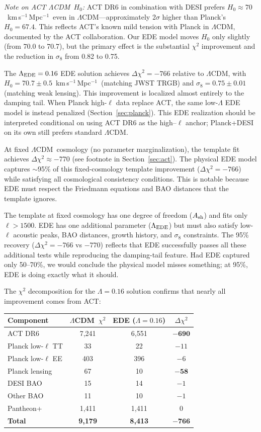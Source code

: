 \documentclass[twocolumn,showpacs,preprintnumbers,amsmath,amssymb,prd]{revtex4-2}
\newcommand{\lcdm}{$\Lambda$CDM}
\newcommand{\kms}{km\,s$^{-1}$\,Mpc$^{-1}$}
\begin{document}
\emph{Note on ACT \lcdm\ $H_0$:} ACT DR6 in combination with DESI prefers 
$H_0 \approx 70$~\kms\ even in \lcdm---approximately 2$\sigma$ higher than Planck's 
$H_0 = 67.4$. This reflects ACT's known mild tension with Planck in \lcdm, 
documented by the ACT collaboration. Our EDE model moves $H_0$ only slightly 
(from 70.0 to 70.7), but the primary effect is the substantial $\chi^2$ improvement 
and the reduction in $\sigma_8$ from 0.82 to 0.75.

The $\Lambda_{\rm EDE} = 0.16$ EDE solution achieves $\Delta\chi^2 = -766$ relative to \lcdm, 
with $H_0 = 70.7 \pm 0.5$~\kms\ (matching JWST TRGB) and $\sigma_8 = 0.75 \pm 0.01$ 
(matching weak lensing). This improvement is localized almost entirely to the damping tail. When 
Planck high-$\ell$ data replace ACT, the same low-$\Lambda$ EDE model is instead 
penalized (Section~\ref{sec:planck}). This EDE realization should be interpreted 
conditional on using ACT DR6 as the high--$\ell$ anchor; Planck+DESI on its own 
still prefers standard $\Lambda$CDM.

At fixed \lcdm\ cosmology (no parameter marginalization), the template fit 
achieves $\Delta\chi^2 \approx -770$ (see footnote in Section~\ref{sec:act}). 
The physical EDE model captures $\sim$95\% of this fixed-cosmology template 
improvement ($\Delta\chi^2 = -766$) while satisfying all cosmological consistency 
conditions. This is notable because EDE must respect the Friedmann 
equations and BAO distances that the template ignores.

The template at fixed cosmology has one degree of freedom ($A_{\rm sh}$) and fits 
only $\ell > 1500$. EDE has one additional parameter ($\Lambda_{\rm EDE}$) but must 
also satisfy low-$\ell$ acoustic peaks, BAO distances, growth history, and 
$\sigma_8$ constraints. The 95\% recovery ($\Delta\chi^2 = -766$ vs $-770$) 
reflects that EDE successfully passes all these additional tests while reproducing 
the damping-tail feature. 
Had EDE captured only 50--70\%, we would conclude the physical model misses 
something; at 95\%, EDE is doing exactly what it should.

The $\chi^2$ decomposition for the $\Lambda = 0.16$ solution confirms that nearly 
all improvement comes from ACT:
\begin{center}
\begin{tabular}{lccc}
\toprule
Component & \lcdm\ $\chi^2$ & EDE ($\Lambda = 0.16$) & $\Delta\chi^2$ \\
\midrule
ACT DR6 & 7{,}241 & 6{,}551 & $\mathbf{-690}$ \\
Planck low-$\ell$ TT & 33 & 22 & $-11$ \\
Planck low-$\ell$ EE & 403 & 396 & $-6$ \\
Planck lensing & 67 & 10 & $\mathbf{-58}$ \\
DESI BAO & 15 & 14 & $-1$ \\
Other BAO & 11 & 10 & $-1$ \\
Pantheon+ & 1{,}411 & 1{,}411 & $0$ \\
\midrule
\textbf{Total} & \textbf{9{,}179} & \textbf{8{,}413} & $\mathbf{-766}$ \\
\bottomrule
\end{tabular}
\end{center}
\end{document}
